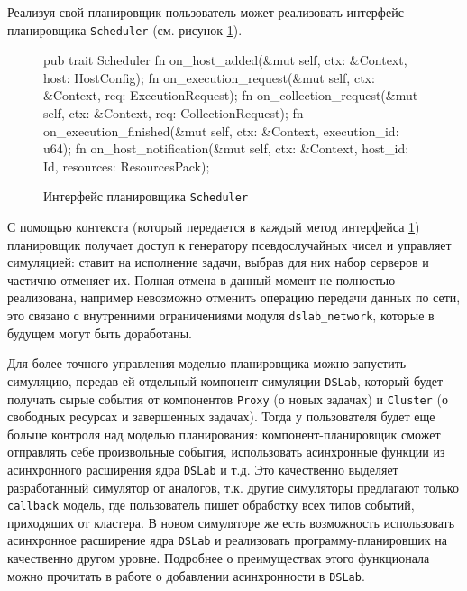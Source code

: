 Реализуя свой планировщик пользователь может реализовать интерфейс планировщика \texttt{Scheduler} (см. рисунок \ref{fig:scheduler-interface}). 

\begin{figure}[h!]
    \footnotesize
    \begin{rustcode}
pub trait Scheduler {
  fn on_host_added(&mut self, ctx: &Context, host: HostConfig);
  fn on_execution_request(&mut self, ctx: &Context, req: ExecutionRequest);
  fn on_collection_request(&mut self, ctx: &Context, req: CollectionRequest);
  fn on_execution_finished(&mut self, ctx: &Context, execution_id: u64);
  fn on_host_notification(&mut self, ctx: &Context, host_id: Id, resources: ResourcesPack);
}
    \end{rustcode}
    \caption{Интерфейс планировщика \texttt{Scheduler}}
    \label{fig:scheduler-interface}
\end{figure}

С помощью контекста (который передается в каждый метод интерфейса \ref{fig:scheduler-interface}) планировщик получает доступ к генератору псевдослучайных чисел и управляет симуляцией: ставит на исполнение задачи, выбрав для них набор серверов и частично отменяет их. Полная отмена в данный момент не полностью реализована, например невозможно отменить операцию передачи данных по сети, это связано с внутренними ограничениями  модуля \texttt{dslab\_network}, которые в будущем могут быть доработаны.

Для более точного управления моделью планировщика можно запустить симуляцию, передав ей отдельный компонент симуляции \texttt{DSLab}, который будет получать сырые события от компонентов \texttt{Proxy} (о новых задачах) и \texttt{Cluster} (о свободных ресурсах и завершенных задачах). Тогда у пользователя будет еще больше контроля над моделью планирования: компонент-планировщик сможет отправлять себе произвольные события, использовать асинхронные функции из асинхронного расширения ядра \texttt{DSLab} и т.д. Это качественно выделяет разработанный симулятор от аналогов, т.к. другие симуляторы предлагают только \texttt{callback} модель, где пользователь пишет обработку всех типов событий, приходящих от кластера. В новом симуляторе же есть возможность использовать асинхронное расширение ядра \texttt{DSLab} и реализовать программу-планировщик на качественно другом уровне. Подробнее о преимуществах этого функционала можно прочитать в работе о добавлении асинхронности в \texttt{DSLab}\cite{async-dslab}.



